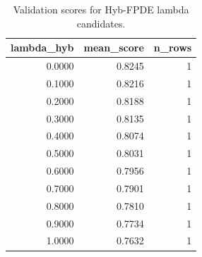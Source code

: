 \begin{table}[t]
\caption{Validation scores for Hyb-FPDE lambda candidates.}
\label{tab:lambda_distribution_computed}
\centering
\begin{tabular}{rrr}
\toprule
lambda\_hyb & mean\_score & n\_rows \\
\midrule
0.0000 & 0.8245 & 1 \\
0.1000 & 0.8216 & 1 \\
0.2000 & 0.8188 & 1 \\
0.3000 & 0.8135 & 1 \\
0.4000 & 0.8074 & 1 \\
0.5000 & 0.8031 & 1 \\
0.6000 & 0.7956 & 1 \\
0.7000 & 0.7901 & 1 \\
0.8000 & 0.7810 & 1 \\
0.9000 & 0.7734 & 1 \\
1.0000 & 0.7632 & 1 \\
\bottomrule
\end{tabular}

\end{table}
